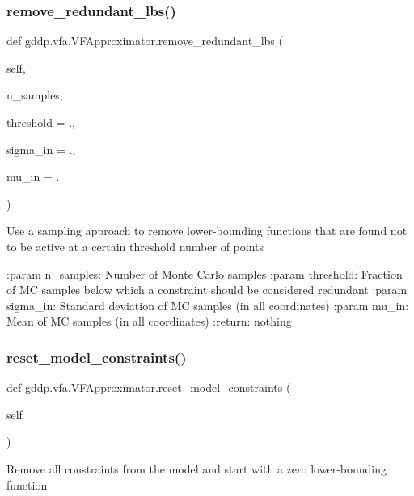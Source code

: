 \subsubsection{\texorpdfstring{remove\_redundant\_lbs()}{remove\_redundant\_lbs()}}
{\footnotesize\ttfamily def gddp.\+vfa.\+V\+F\+Approximator.\+remove\+\_\+redundant\+\_\+lbs (\begin{DoxyParamCaption}\item[{}]{self,  }\item[{}]{n\+\_\+samples,  }\item[{}]{threshold = {.},  }\item[{}]{sigma\+\_\+in = {.},  }\item[{}]{mu\+\_\+in = {.} }\end{DoxyParamCaption})}

\begin{DoxyVerb}Use a sampling approach to remove lower-bounding functions that are found not to be
active at a certain threshold number of points

:param n_samples: Number of Monte Carlo samples
:param threshold: Fraction of MC samples below which a constraint should be considered
    redundant
:param sigma_in: Standard deviation of MC samples (in all coordinates)
:param mu_in: Mean of MC samples (in all coordinates)
:return: nothing
\end{DoxyVerb}
 \mbox{\label{classgddp_1_1vfa_1_1_v_f_approximator_a9ed1c360f3f89aab1b0f5da4e2dc270f}} 
\subsubsection{\texorpdfstring{reset\_model\_constraints()}{reset\_model\_constraints()}}
{\footnotesize\ttfamily def gddp.\+vfa.\+V\+F\+Approximator.\+reset\+\_\+model\+\_\+constraints (\begin{DoxyParamCaption}\item[{}]{self }\end{DoxyParamCaption})}

\begin{DoxyVerb}Remove all constraints from the model and start with a zero lower-bounding function\end{DoxyVerb}
 \mbox{\label{classgddp_1_1vfa_1_1_v_f_approximator_af7e7b99c9816b5c809ea1a4b90c67df5}} 
